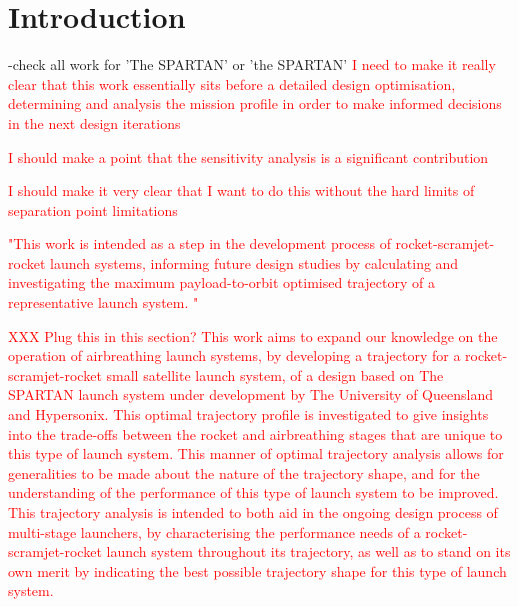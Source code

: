 
\cleardoublepage
\chapter{Introduction}
-check all work for 'The SPARTAN' or 'the SPARTAN'
\textcolor{red}{I need to make it really clear that this work essentially sits before a detailed design optimisation, determining and analysis the mission profile in order to make informed decisions in the next design iterations}
  	
  	\textcolor{red}{I should make a point that the sensitivity analysis is a significant contribution}
  	
  	\textcolor{red}{I should make it very clear that I want to do this without the hard limits of separation point limitations}
  	
  	\textcolor{red}{"This work is intended as a step in the development process of rocket-scramjet-rocket launch systems, informing future design studies by calculating and investigating the maximum payload-to-orbit optimised trajectory of a representative launch system. "}
  	
  	
  	\textcolor{red}{ XXX Plug this in this section? This work aims to expand our knowledge on the operation of airbreathing launch systems, by developing a trajectory for a rocket-scramjet-rocket small satellite launch system, of a design based on The SPARTAN launch system under development by The University of Queensland and Hypersonix. This optimal trajectory profile is investigated to give insights into the trade-offs between the rocket and airbreathing stages that are unique to this type of launch system. This manner of optimal trajectory analysis allows for generalities to be made about the nature of the trajectory shape, and for the understanding of the performance of this type of launch system to be improved.
  	This trajectory analysis is intended to both aid in the ongoing design process of multi-stage launchers, by characterising the performance needs of a rocket-scramjet-rocket launch system throughout its trajectory, as well as to stand on its own merit by indicating the best possible trajectory shape for this type of launch system. }
  	
